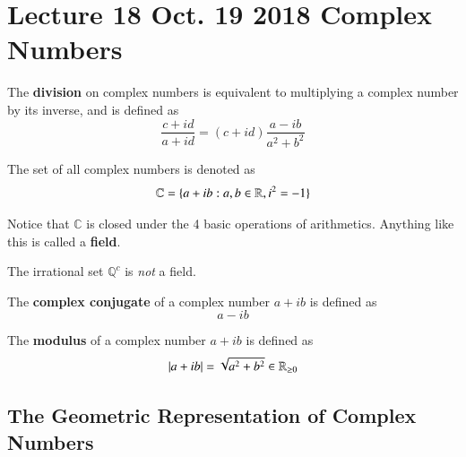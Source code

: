 \documentclass[11pt]{article}
\begin{document}
	\section{Lecture 18 Oct. 19 2018 Complex Numbers}
	\begin{definition}
		The \textbf{division} on complex numbers is equivalent to multiplying a complex number by its inverse, and is defined as 
		\[
			\frac{c+id}{a+id} = (c+id) \frac{a-ib}{a^2 + b^2}
		\]
	\end{definition}
	
	\begin{notation}
		The set of all complex numbers is denoted as 
		\[
			\mathbb{C} = \{ a + ib : a, b \in \mathbb{R}, i^2 = - 1\}
		\]
	\end{notation}
	\begin{remark}
		Notice that $\mathbb{C}$ is closed under the 4 basic operations of arithmetics. Anything like this is called a \textbf{field}.
	\end{remark}
	
	\begin{example}
		The irrational set $\mathbb{Q}^c$ is \emph{not} a field.
	\end{example}
	
	\begin{definition}
		The \textbf{complex conjugate} of a complex number $a + ib$ is defined as 
		\[
			a - ib
		\]
	\end{definition}
	
	\begin{definition}
		The \textbf{modulus} of a complex number $a + ib$ is defined as 
		\[
			|a + ib| = \sqrt{a^2 + b^2} \in \mathbb{R}_{\geq 0}
		\]
	\end{definition}
	
	\subsection{The Geometric Representation of Complex Numbers}
	
\end{document}
